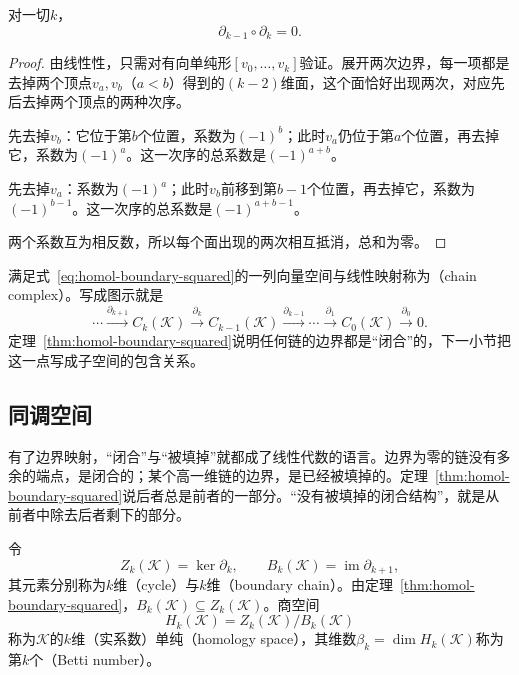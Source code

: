 \begin{theorem}[边界的边界为零]
\label{thm:homol-boundary-squared}
对一切$k$，
\begin{equation}
 \partial_{k-1}\circ\partial_k=0.
 \label{eq:homol-boundary-squared}
\end{equation}
\end{theorem}

\begin{proof}
由线性性，只需对有向单纯形$[v_0,\ldots,v_k]$验证。展开两次边界，每一项都是去掉两个顶点$v_a,v_b$（$a<b$）得到的$(k-2)$维面，这个面恰好出现两次，对应先后去掉两个顶点的两种次序。

先去掉$v_b$：它位于第$b$个位置，系数为$(-1)^b$；此时$v_a$仍位于第$a$个位置，再去掉它，系数为$(-1)^a$。这一次序的总系数是$(-1)^{a+b}$。

先去掉$v_a$：系数为$(-1)^a$；此时$v_b$前移到第$b-1$个位置，再去掉它，系数为$(-1)^{b-1}$。这一次序的总系数是$(-1)^{a+b-1}$。

两个系数互为相反数，所以每个面出现的两次相互抵消，总和为零。
\end{proof}

满足式~\eqref{eq:homol-boundary-squared}的一列向量空间与线性映射称为（chain complex）。写成图示就是
\[
 \cdots\xrightarrow{\partial_{k+1}}C_k(\mathcal K)\xrightarrow{\partial_k}C_{k-1}(\mathcal K)\xrightarrow{\partial_{k-1}}\cdots\xrightarrow{\partial_1}C_0(\mathcal K)\xrightarrow{\partial_0}0.
\]
定理~\ref{thm:homol-boundary-squared}说明任何链的边界都是“闭合”的，下一小节把这一点写成子空间的包含关系。

\subsection{同调空间}
\label{sec:homol-homology-spaces}

有了边界映射，“闭合”与“被填掉”就都成了线性代数的语言。边界为零的链没有多余的端点，是闭合的；某个高一维链的边界，是已经被填掉的。定理~\ref{thm:homol-boundary-squared}说后者总是前者的一部分。“没有被填掉的闭合结构”，就是从前者中除去后者剩下的部分。

\begin{definition}[闭链、边界链与同调空间]
\label{def:homol-homology}
令
\begin{equation}
 Z_k(\mathcal K)=\ker\partial_k,\qquad B_k(\mathcal K)=\operatorname{im}\partial_{k+1},
 \label{eq:homol-cycles-boundaries}
\end{equation}
其元素分别称为$k$维（cycle）与$k$维（boundary chain）。由定理~\ref{thm:homol-boundary-squared}，$B_k(\mathcal K)\subseteq Z_k(\mathcal K)$。商空间
\begin{equation}
 H_k(\mathcal K)=Z_k(\mathcal K)/B_k(\mathcal K)
 \label{eq:homol-homology}
\end{equation}
称为$\mathcal K$的$k$维（实系数）单纯（homology space），其维数$\beta_k=\dim H_k(\mathcal K)$称为第$k$个（Betti number）。
\end{definition}

